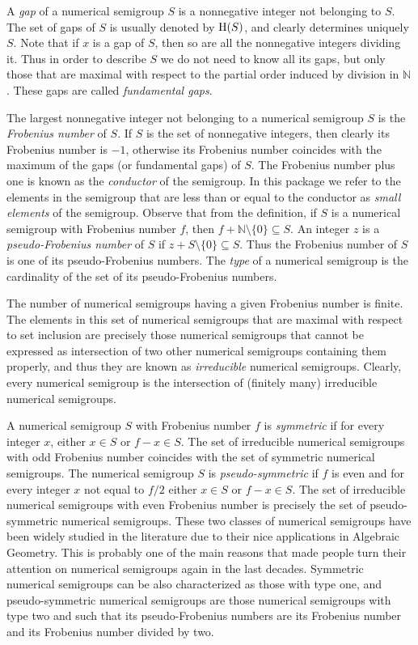\documentclass[a4paper,11pt]{report}
\begin{document}
{ A \label{xx1}\emph{gap} of a numerical semigroup $S$ is a nonnegative integer not belonging to $S$. The set of gaps of $S$ is usually denoted by ${\rm H}(S)$, and clearly determines uniquely $S$. Note that if $x$ is a gap of $S$, then so are all the nonnegative integers dividing it. Thus in order to
describe $S$ we do not need to know all its gaps, but only those that are maximal with
respect to the partial order induced by division in ${\mathbb N}$. These gaps are called \label{lab1}\emph{fundamental gaps}. 

 The largest nonnegative integer not belonging to a numerical semigroup $S$ is the \emph{Frobenius number} of $S$. If $S$ is the set of nonnegative integers, then clearly its Frobenius number is $-1$, otherwise its Frobenius number coincides with the maximum of the gaps (or
fundamental gaps) of $S$. The Frobenius number plus one is known as the \emph{conductor} of the semigroup. In this package we refer to the elements in the semigroup
that are less than or equal to the conductor as \label{zlab1}\emph{small elements} of the semigroup. Observe that from the definition, if $S$ is a numerical semigroup with Frobenius number $f$, then $f+{\mathbb N}\setminus\{0\}\subseteq S$. An integer $z$ is a \label{lab2}\emph{pseudo-Frobenius number} of $S$ if $z+S\setminus\{0\}\subseteq S$. Thus the Frobenius number of $S$ is one of its pseudo-Frobenius numbers. The \emph{type} of a numerical semigroup is the cardinality of the set of its pseudo-Frobenius
numbers. 

 The number of numerical semigroups having a given Frobenius number is finite.
The elements in this set of numerical semigroups that are maximal with respect
to set inclusion are precisely those numerical semigroups that cannot be
expressed as intersection of two other numerical semigroups containing them
properly, and thus they are known as \emph{irreducible} numerical semigroups. Clearly, every numerical semigroup is the intersection
of (finitely many) irreducible numerical semigroups. 

 A numerical semigroup $S$ with Frobenius number $f$ is \emph{symmetric} if for every integer $x$, either $x\in S$ or $f-x\in S$. The set of irreducible numerical semigroups with odd Frobenius number
coincides with the set of symmetric numerical semigroups. The numerical
semigroup $S$ is \emph{pseudo-symmetric} if $f$ is even and for every integer $x$ not equal to $f/2$ either $x\in S$ or $f-x\in S$. The set of irreducible numerical semigroups with even Frobenius number is
precisely the set of pseudo-symmetric numerical semigroups. These two classes
of numerical semigroups have been widely studied in the literature due to
their nice applications in Algebraic Geometry. This is probably one of the
main reasons that made people turn their attention on numerical semigroups
again in the last decades. Symmetric numerical semigroups can be also
characterized as those with type one, and pseudo-symmetric numerical
semigroups are those numerical semigroups with type two and such that its
pseudo-Frobenius numbers are its Frobenius number and its Frobenius number
divided by two. 

}
\end{document}
